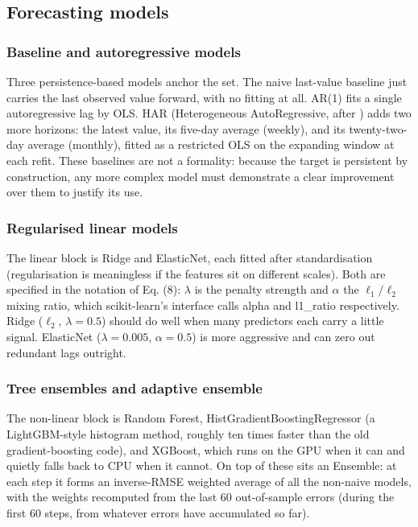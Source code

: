 \subsection{Forecasting models}

\subsubsection{Baseline and autoregressive models}

Three persistence-based models anchor the set. The naive last-value baseline just carries the last observed value forward, with no fitting at all. AR(1) fits a single autoregressive lag by OLS. HAR (Heterogeneous AutoRegressive, after \cite{corsi2009har}) adds two more horizons: the latest value, its five-day average (weekly), and its twenty-two-day average (monthly), fitted as a restricted OLS on the expanding window at each refit. These baselines are not a formality: because the target is persistent by construction, any more complex model must demonstrate a clear improvement over them to justify its use.

\subsubsection{Regularised linear models}

The linear block is Ridge and ElasticNet, each fitted after standardisation (regularisation is meaningless if the features sit on different scales). Both are specified in the notation of Eq. (8): $\lambda$ is the penalty strength and $\alpha$ the $\ell_1/\ell_2$ mixing ratio, which scikit-learn's interface calls alpha and l1\_ratio respectively. Ridge ($\ell_2$, $\lambda = 0.5$) should do well when many predictors each carry a little signal. ElasticNet ($\lambda = 0.005$, $\alpha = 0.5$) is more aggressive and can zero out redundant lags outright.

\subsubsection{Tree ensembles and adaptive ensemble}

The non-linear block is Random Forest, HistGradientBoostingRegressor (a LightGBM-style histogram method, roughly ten times faster than the old gradient-boosting code), and XGBoost, which runs on the GPU when it can and quietly falls back to CPU when it cannot. On top of these sits an Ensemble: at each step it forms an inverse-RMSE weighted average of all the non-naive models, with the weights recomputed from the last 60 out-of-sample errors (during the first 60 steps, from whatever errors have accumulated so far).

